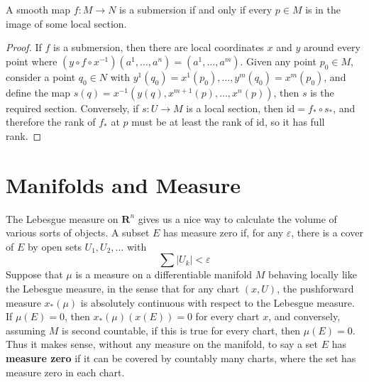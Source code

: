 \begin{theorem}
    A smooth map $f: M \to N$ is a submersion if and only if every $p \in M$ is in the image of some local section.
\end{theorem}
\begin{proof}
    If $f$ is a submersion, then there are local coordinates $x$ and $y$ around every point where $(y \circ f \circ x^{-1})(a^1, \dots, a^n) = (a^1, \dots, a^m)$. Given any point $p_0 \in M$, consider a point $q_0 \in N$ with $y^1(q_0) = x^1(p_0), \dots, y^m(q_0) = x^m(p_0)$, and define the map $s(q) = x^{-1}(y(q), x^{m+1}(p), \dots, x^n(p))$, then $s$ is the required section. Conversely, if $s: U \to M$ is a local section, then $\text{id} = f_* \circ s_*$, and therefore the rank of $f_*$ at $p$ must be at least the rank of $\text{id}$, so it has full rank.
\end{proof}

\section{Manifolds and Measure}

The Lebesgue measure on $\mathbf{R}^n$ gives us a nice way to calculate the volume of various sorts of objects. A subset $E$ has measure zero if, for any $\varepsilon$, there is a cover of $E$ by open sets $U_1, U_2, \dots$ with
%
\[ \sum |U_k| < \varepsilon \]
%
Suppose that $\mu$ is a measure on a differentiable manifold $M$ behaving locally like the Lebesgue measure, in the sense that for any chart $(x,U)$, the pushforward measure $x_*(\mu)$ is absolutely continuous with respect to the Lebesgue measure. If $\mu(E) = 0$, then $x_*(\mu)(x(E)) = 0$ for every chart $x$, and conversely, assuming $M$ is second countable, if this is true for every chart, then $\mu(E) = 0$. Thus it makes sense, without any measure on the manifold, to say a set $E$ has {\bf measure zero} if it can be covered by countably many charts, where the set has measure zero in each chart.

